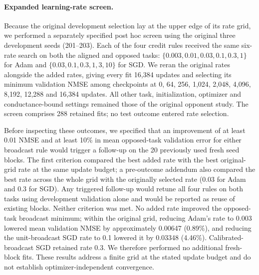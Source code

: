 \paragraph{Expanded learning-rate screen.}
Because the original development selection lay at the upper edge of its rate grid, we performed a separately specified post hoc screen using the original three development seeds (201--203). Each of the four credit rules received the same six-rate search on both the aligned and opposed tasks: $\{0.003,0.01,0.03,0.1,0.3,1\}$ for Adam and $\{0.03,0.1,0.3,1,3,10\}$ for SGD. We reran the original rates alongside the added rates, giving every fit 16,384 updates and selecting its minimum validation NMSE among checkpoints at 0, 64, 256, 1,024, 2,048, 4,096, 8,192, 12,288 and 16,384 updates. All other task, initialization, optimizer and conductance-bound settings remained those of the original opponent study. The screen comprises 288 retained fits; no test outcome entered rate selection.

Before inspecting these outcomes, we specified that an improvement of at least 0.01 NMSE and at least 10\% in mean opposed-task validation error for either broadcast rule would trigger a follow-up on the 20 previously used fresh seed blocks. The first criterion compared the best added rate with the best original-grid rate at the same update budget; a pre-outcome addendum also compared the best rate across the whole grid with the originally selected rate (0.03 for Adam and 0.3 for SGD). Any triggered follow-up would retune all four rules on both tasks using development validation alone and would be reported as reuse of existing blocks. Neither criterion was met. No added rate improved the opposed-task broadcast minimum; within the original grid, reducing Adam's rate to 0.003 lowered mean validation NMSE by approximately 0.00647 (0.89\%), and reducing the unit-broadcast SGD rate to 0.1 lowered it by 0.03348 (4.46\%). Calibrated-broadcast SGD retained rate 0.3. We therefore performed no additional fresh-block fits. These results address a finite grid at the stated update budget and do not establish optimizer-independent convergence.
